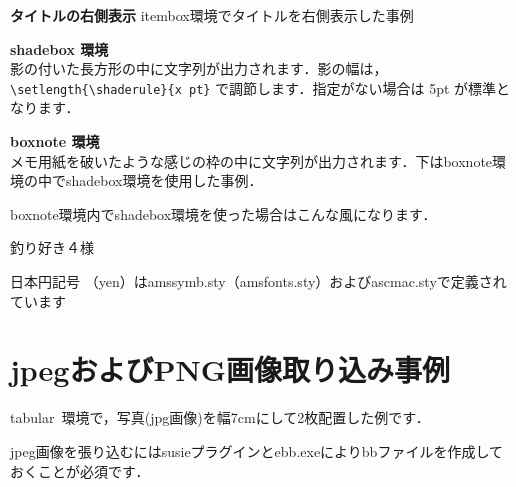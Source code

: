 \documentclass[a4paper,10pt]{jsarticle}
\begin{document}
\begin{itembox}[r]{\bfseries タイトルの右側表示}
itembox環境でタイトルを右側表示した事例
\end{itembox}

\vspace{1zh}
\setlength{\shaderule}{4pt}
\begin{shadebox}
{\bfseries\large shadebox 環境}\\
影の付いた長方形の中に文字列が出力されます．影の幅は，\verb+\setlength{\shaderule}{x pt}+ で調節します．指定がない場合は 5pt が標準となります．
\end{shadebox}

\begin{boxnote}
{\bfseries\large boxnote 環境}\\
メモ用紙を破いたような感じの枠の中に文字列が出力されます．下はboxnote環境の中でshadebox環境を使用した事例．
\vspace{1zh}

\begin{shadebox}
boxnote環境内でshadebox環境を使った場合はこんな風になります．
\begin{flushright}釣り好き４様\end{flushright}
\end{shadebox}

\end{boxnote}

\begin{center}
{日本円記号 \yen （\yen yen）はamssymb.sty（amsfonts.sty）およびascmac.styで定義されています}
\end{center}

\pagebreak





\section{jpegおよびPNG画像取り込み事例}
tabular~環境で，写真(jpg画像)を幅7cmにして2枚配置した例です．

jpeg画像を張り込むにはsusieプラグインとebb.exeによりbbファイルを作成しておくことが必須です．
\end{document}
